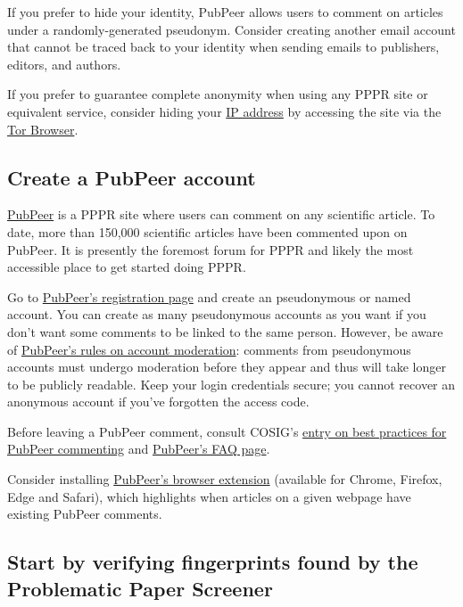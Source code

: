 \documentclass[letterpaper, 12pt]{article}
\begin{document}
If you prefer to hide your identity, PubPeer allows users to comment on articles under a randomly-generated pseudonym. Consider creating another email account that cannot be traced back to your identity when sending emails to publishers, editors, and authors. 

If you prefer to guarantee complete anonymity when using any PPPR site or equivalent service, consider hiding your \href{https://en.wikipedia.org/wiki/IP_address}{IP address} by accessing the site via the \href{https://www.torproject.org/}{Tor Browser}.

\subsection*{Create a PubPeer account}

\href{https://pubpeer.com/}{PubPeer} is a PPPR site where users can comment on any scientific article. To date, more than 150,000 scientific articles have been commented upon on PubPeer. It is presently the foremost forum for PPPR and likely the most accessible place to get started doing PPPR.

Go to \href{https://pubpeer.com/register}{PubPeer's registration page} and create an pseudonymous or named account.
You can create as many pseudonymous accounts as you want if you don't want some comments to be linked to the same person.
However, be aware of \href{https://pubpeer.com/static/faq#24}{PubPeer's rules on account moderation}: comments from pseudonymous accounts must undergo moderation before they appear and thus will take longer to be publicly readable. Keep your login credentials secure; you cannot recover an anonymous account if you've forgotten the access code.

Before leaving a PubPeer comment, consult COSIG's \href{https://osf.io/sghaq}{entry on best practices for PubPeer commenting} and \href{https://pubpeer.com/static/faq}{PubPeer's FAQ page}.

Consider installing \href{https://pubpeer.com/static/extensions}{PubPeer's browser extension} (available for Chrome, Firefox, Edge and Safari), which highlights when articles on a given webpage have existing PubPeer comments.

\subsection*{Start by verifying fingerprints found by the Problematic Paper Screener}
\end{document}
